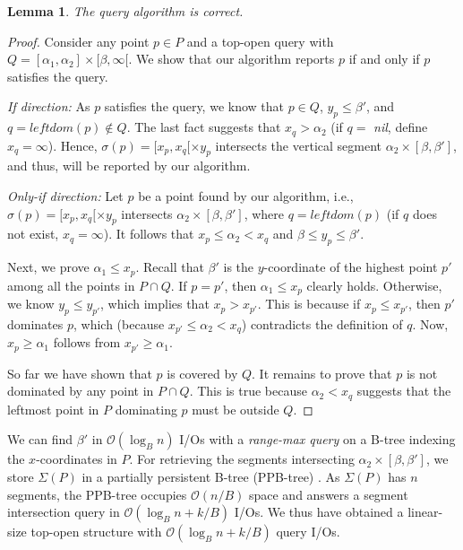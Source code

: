 \documentclass{sig-alternate}
\newtheorem{lemma}{Lemma}
\DeclareMathOperator*{\intr}{\cap}
\def\leftdom{\mathit{leftdom}}
\def\intr{\cap}
\newcommand{\bigO}{\mathcal{O}}
\newcommand{\nil}{\textit{nil}}
\renewcommand{\(}{\left(}
\renewcommand{\)}{\right)}
\begin{document}
\begin{fullenv}
\begin{lemma} \label{lmm:topopen-correct}
	The query algorithm is correct.
\end{lemma}

\begin{proof}
  Consider any point $p \in P$ and a top-open query with $Q = [\alpha_1,
  \alpha_2] \times [\beta, \infty[$. We show that our algorithm reports $p$ if
  and only if $p$ satisfies the query.

  \vspace{2mm} {\em If direction:} As $p$ satisfies the query, we know that $p
  \in Q$, $y_p \le \beta'$, and $q = \leftdom(p) \notin Q$. The last fact
  suggests that $x_q > \alpha_2$ (if $q =$ \nil, define $x_q =
  \infty$). Hence, $\sigma(p) = [x_p, x_q[ \times y_p$ intersects the vertical
  segment $\alpha_2 \times [\beta, \beta']$, and thus, will be reported by our
  algorithm.

  \vspace{2mm} {\em Only-if direction:} Let $p$ be a point found by our
  algorithm, i.e., $\sigma(p) = [x_p, x_q[ \times y_p$ intersects $\alpha_2
  \times [\beta, \beta']$, where $q = \leftdom(p)$ (if $q$ does not exist, $x_q
  = \infty$). It follows that $x_p \le \alpha_2 < x_q$ and $\beta \le y_p \le
  \beta'$.

  Next, we prove $\alpha_1 \le x_p$. Recall that $\beta'$ is the $y$-coordinate
  of the highest point $p'$ among all the points in $P \intr Q$. If $p = p'$,
  then $\alpha_1 \le x_p$ clearly holds. Otherwise, we know $y_p \leq y_{p'}$,
  which implies that $x_p > x_{p'}$. This is because if $x_p \leq x_{p'}$, then
  $p'$ dominates $p$, which (because $x_{p'} \le \alpha_2 < x_q$) contradicts
  the definition of $q$. Now, $x_p \ge \alpha_1$ follows from $x_{p'} \ge
  \alpha_1$.

  So far we have shown that $p$ is covered by $Q$. It remains to prove that $p$
  is not dominated by any point in $P \intr Q$. This is true because $\alpha_2
  < x_q$ suggests that the leftmost point in $P$ dominating $p$ must be outside
  $Q$.
\end{proof}
\end{fullenv}

We can find $\beta'$ in $\bigO(\log_B n)$ I/Os with a {\em range-max query} on
a B-tree indexing the $x$-coordinates in $P$. For retrieving the segments
intersecting $\alpha_2 \times [\beta, \beta']$, we store $\Sigma(P)$ in a
partially persistent B-tree (PPB-tree) \cite{BGOSW96}. As $\Sigma(P)$ has $n$
segments, the PPB-tree occupies $\bigO(n/B)$ space and answers a segment
intersection query in $\bigO(\log_B n + k/B)$ I/Os. We thus have obtained a
linear-size top-open structure with $\bigO(\log_B n + k/B)$ query I/Os.
\end{document}
